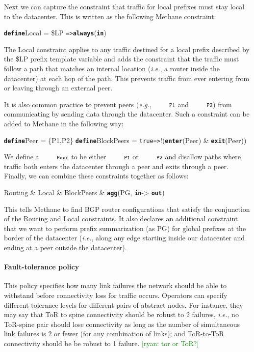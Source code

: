 \documentclass[numbers, 10pt, preprint]{sigplanconf}
\newcommand{\ryan}[1]{\textcolor{green}{[ryan: #1]}}
\newcommand{\EG}{\emph{e.g.}}
\newcommand{\IE}{\emph{i.e.}}
\newcommand{\sysname}{{\small \sf Methane}\xspace}
\newcommand{\para}[1]{\paragraph*{\textbf{#1}}}
\newcommand{\CD}[1]{\texttt{\small #1}}  %
\newcommand{\KW}[1]{\texttt{\small\bfseries{#1}}}
\newcommand{\True}{\CD{true}}
\newcommand{\Define}{\KW{define}}
\newcommand{\Path}{\texttt{=>}}
\newcommand{\Agg}{\KW{agg}}
\newcommand{\In}{\KW{in}}
\newcommand{\Out}{\KW{out}}
\newcommand{\Exit}{\KW{exit}}
\newcommand{\Enter}{\KW{enter}}
\newcommand{\Always}{\KW{always}}
\begin{document}
Next we can capture the constraint that traffic for local prefixes must stay local to the datacenter.
This is written as the following \sysname constraint:
%
\begin{code}
\Define Local =
    \$LP \Path \Always(\In)
\end{code}
\noindent%
%
The Local constraint applies to any traffic destined for a local prefix described by the \$LP prefix template variable and adds the constraint that the traffic must follow a path that matches an internal location (\IE, a router inside the datacenter) at each hop of the path. This prevents traffic from ever entering from or leaving through an external peer.

It is also common practice to prevent peers (\EG, $\CD{P1}$ and $\CD{P2}$) from communicating by sending data through the datacenter. Such a constraint can be added to \sysname in the following way:
%
\begin{code}
\Define Peer = \{P1,P2\}
\Define BlockPeers =
    \True \Path !(\Enter(Peer) & \Exit(Peer))
\end{code}
\noindent%
%
We define a $\CD{Peer}$ to be either $\CD{P1}$ or $\CD{P2}$ and disallow paths where traffic both enters the datacenter through a peer and exits through a peer. Finally, we can combine these constraints together as follows:

\begin{code}
Routing & Local & BlockPeers & \Agg(PG, \In -> \Out)
\end{code}
\noindent%

This tells \sysname to find BGP router configurations that satisfy the conjunction of the Routing and Local constraints. It also declares an additional constraint that we want to perform prefix summarization (as PG) for global prefixes at the border of the datacenter (\IE, along any edge starting inside our datacenter and ending at a peer outside the datacenter).

\para{Fault-tolerance policy} This policy specifies how many link failures the network should be able to withstand before connectivity loss for traffic occurs. Operators can  specify different tolerance levels for different pairs of abstract nodes. For instance, they may say that ToR to spine connectivity should be robust to 2 failures, \IE, no ToR-spine pair should lose connectivity as long as the number of simultaneous link failures is 2 or fewer (for any combination of links); and ToR-to-ToR connectivity should be be robust to 1 failure.
\ryan{tor or ToR?}
\end{document}
